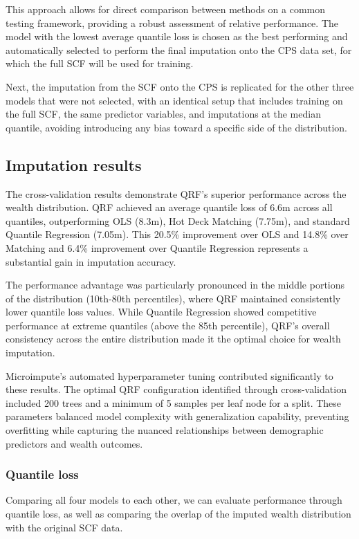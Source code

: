 This approach allows for direct comparison between methods on a common testing framework, providing a robust assessment of relative performance. The model with the lowest average quantile loss is chosen as the best performing and automatically selected to perform the final imputation onto the CPS data set, for which the full SCF will be used for training. 

Next, the imputation from the SCF onto the CPS is replicated for the other three models that were not selected, with an identical setup that includes training on the full SCF, the same predictor variables, and imputations at the median quantile, avoiding introducing any bias toward a specific side of the distribution. 

\subsection{Imputation results}

The cross-validation results demonstrate QRF's superior performance across the wealth distribution. QRF achieved an average quantile loss of 6.6m across all quantiles, outperforming OLS (8.3m), Hot Deck Matching (7.75m), and standard Quantile Regression (7.05m). This 20.5\% improvement over OLS and 14.8\% over Matching and 6.4\% improvement over Quantile Regression represents a substantial gain in imputation accuracy.

The performance advantage was particularly pronounced in the middle portions of the distribution (10th-80th percentiles), where QRF maintained consistently lower quantile loss values. While Quantile Regression showed competitive performance at extreme quantiles (above the 85th percentile), QRF's overall consistency across the entire distribution made it the optimal choice for wealth imputation.

Microimpute's automated hyperparameter tuning contributed significantly to these results. The optimal QRF configuration identified through cross-validation included 200 trees and a minimum of 5 samples per leaf node for a split. These parameters balanced model complexity with generalization capability, preventing overfitting while capturing the nuanced relationships between demographic predictors and wealth outcomes.

\subsubsection{Quantile loss}

Comparing all four models to each other, we can evaluate performance through quantile loss, as well as comparing the overlap of the imputed wealth distribution with the original SCF data. 

